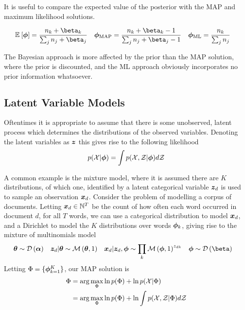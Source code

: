 It is useful to compare the expected value of the posterior with the MAP and maximum likelihood solutions.

\begin{align}
\ex{\param}{}  &= \frac{n_k + \beta_k}{\sum_j n_j + \beta_j} &
\map{\param} &= \frac{n_k + \beta_k - 1}{\sum_j n_j + \beta_j - 1} &
\ml{\param}  &= \frac{n_k}{\sum_j n_j}
\end{align}

The Bayesian approach is more affected by the prior than the MAP solution, where the prior is discounted, and the ML approach obviously incorporates no prior information whatsoever.
 
\subsection{Latent Variable Models}
Oftentimes it is appropriate to assume that there is some unobserved, latent process which determines the distributions of the observed variables. Denoting the latent variables as $\bm z$ this gives rise to the following likelihood
\begin{align}
p({ \mathcal{X} }|{ \bm \phi }) = \int p({ \mathcal{X} }, { \mathcal{Z} }|{ \bm \phi }) d{ \mathcal{Z} }
\end{align}

A common example is the mixture model, where it is assumed there are $K$ distributions, of which one, identified by a latent categorical variable $\bm z_d$ is used to sample an observation ${ \bm x_d }$. Consider the problem of modelling a corpus of documents. Letting ${ \bm x_d } \in \mathbb{N}^T$ be the count of how often each word occurred in document $d$, for all $T$ words, we can use a categorical distribution to model ${ \bm x_d }$, and a Dirichlet to model the $K$ distributions over words $\bm \phi_k$, giving rise to the mixture of multinomials model\cite{Nigam2000}
\begin{align}
\vv{\theta} & \sim \dir{\vv{\alpha}} &
\vv{z}_d|\vv{\theta} & \sim \muln{\vv{\theta}}{1} & 
\vv{x}_d|\vv{z}_d, \param & \sim \prod_k \muln{\param}{1}^{z_{dk}} & 
\param & \sim \dir{\vv{\beta}}
\end{align}
Letting $\Phi = \{ \bm \phi_{k=1}^K \}$, our MAP solution is
\begin{align}
\begin{split}
\Phi 
    &= \arg \max_\Phi \ln p(\Phi) + \ln p({ \mathcal{X} }|\Phi) \\
    &= \arg \max_\Phi \ln p(\Phi) + \ln \int { p( { \mathcal{X} } ,  { \mathcal{Z} } | \Phi) } d{ \mathcal{Z} }
\end{split}
\end{align}

